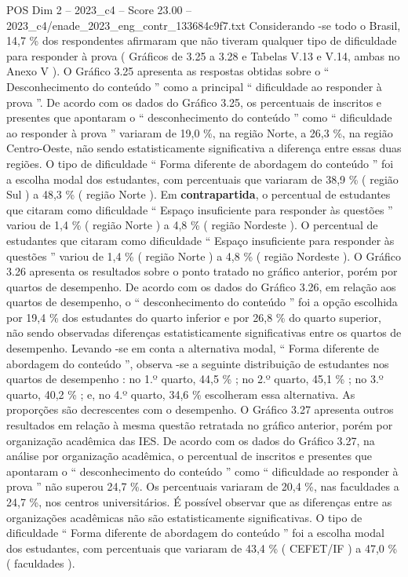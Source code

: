 \begin{textsample}{POS Dim 2 – 2023\_c4 – Score 23.00 – 2023\_c4/enade\_2023\_eng\_contr\_133684c9f7.txt}
Considerando -se todo o Brasil, 14,7 \% dos respondentes afirmaram que não tiveram qualquer tipo de dificuldade para responder à prova ( Gráficos de 3.25 a 3.28 e Tabelas V.13 e V.14, ambas no Anexo V ).
O Gráfico 3.25 apresenta as respostas obtidas sobre o “ Desconhecimento do conteúdo ” como a principal “ dificuldade ao responder à prova ”.
De acordo com os dados do Gráfico 3.25, os percentuais de inscritos e presentes que apontaram o “ desconhecimento do conteúdo ” como “ dificuldade ao responder à prova ” variaram de 19,0 \%, na região Norte, a 26,3 \%, na região Centro-Oeste, não sendo estatisticamente significativa a diferença entre essas duas regiões.
O tipo de dificuldade “ Forma diferente de abordagem do conteúdo ” foi a escolha modal dos estudantes, com percentuais que variaram de 38,9 \% ( região Sul ) a 48,3 \% ( região Norte ).
Em \textbf{contrapartida}, o percentual de estudantes que citaram como dificuldade “ Espaço insuficiente para responder às questões ” variou de 1,4 \% ( região Norte ) a 4,8 \% ( região Nordeste ).
O percentual de estudantes que citaram como dificuldade “ Espaço insuficiente para responder às questões ” variou de 1,4 \% ( região Norte ) a 4,8 \% ( região Nordeste ).
O Gráfico 3.26 apresenta os resultados sobre o ponto tratado no gráfico anterior, porém por quartos de desempenho.
De acordo com os dados do Gráfico 3.26, em relação aos quartos de desempenho, o “ desconhecimento do conteúdo ” foi a opção escolhida por 19,4 \% dos estudantes do quarto inferior e por 26,8 \% do quarto superior, não sendo observadas diferenças estatisticamente significativas entre os quartos de desempenho.
Levando -se em conta a alternativa modal, “ Forma diferente de abordagem do conteúdo ”, observa -se a seguinte distribuição de estudantes nos quartos de desempenho : no 1.º quarto, 44,5 \% ; no 2.º quarto, 45,1 \% ; no 3.º quarto, 40,2 \% ; e, no 4.º quarto, 34,6 \% escolheram essa alternativa.
As proporções são decrescentes com o desempenho.
O Gráfico 3.27 apresenta outros resultados em relação à mesma questão retratada no gráfico anterior, porém por organização acadêmica das IES.
De acordo com os dados do Gráfico 3.27, na análise por organização acadêmica, o percentual de inscritos e presentes que apontaram o “ desconhecimento do conteúdo ” como “ dificuldade ao responder à prova ” não superou 24,7 \%.
Os percentuais variaram de 20,4 \%, nas faculdades a 24,7 \%, nos centros universitários.
É possível observar que as diferenças entre as organizações acadêmicas não são estatisticamente significativas.
O tipo de dificuldade “ Forma diferente de abordagem do conteúdo ” foi a escolha modal dos estudantes, com percentuais que variaram de 43,4 \% ( CEFET/IF ) a 47,0 \% ( faculdades ).

\end{textsample}
